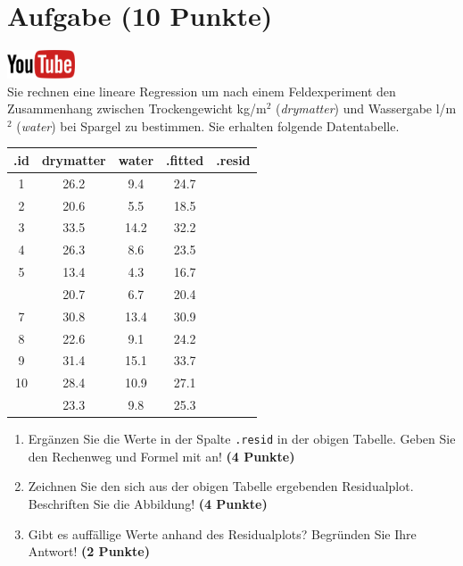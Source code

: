 \documentclass[a4paper, 9pt]{scrartcl}\usepackage[]{graphicx}\usepackage[]{xcolor}
\newenvironment{knitrout}{}{} %
\begin{document}
\section{Aufgabe \hfill (10 Punkte)}

\hfill\href{https://youtu.be/dyQlYV9nOqY}{\includegraphics[width =
  2cm]{img/youtube}}\\[1Ex]

Sie rechnen eine lineare Regression um nach einem Feldexperiment den
Zusammenhang zwischen Trockengewicht kg/m$^2$ (\textit{drymatter}) und
Wassergabe l/m$^2$ (\textit{water}) bei Spargel zu bestimmen. Sie erhalten
folgende Datentabelle.

\begin{knitrout}
\color{fgcolor}\begin{table}[!h]
\centering\begingroup\fontsize{12}{14}\selectfont

\begin{tabular}{ccccc}
\toprule
.id & drymatter & water & .fitted & .resid\\
\midrule
1 & 26.2 & 9.4 & 24.7 & \\
2 & 20.6 & 5.5 & 18.5 & \\
3 & 33.5 & 14.2 & 32.2 & \\
4 & 26.3 & 8.6 & 23.5 & \\
5 & 13.4 & 4.3 & 16.7 & \\
\addlinespace
6 & 20.7 & 6.7 & 20.4 & \\
7 & 30.8 & 13.4 & 30.9 & \\
8 & 22.6 & 9.1 & 24.2 & \\
9 & 31.4 & 15.1 & 33.7 & \\
10 & 28.4 & 10.9 & 27.1 & \\
\addlinespace
11 & 23.3 & 9.8 & 25.3 & \\
\bottomrule
\end{tabular}
\endgroup{}
\end{table}

\end{knitrout}

\begin{enumerate}
\item Erg{\"a}nzen Sie die Werte in der Spalte \texttt{.resid} in der obigen
  Tabelle. Geben Sie den Rechenweg und Formel mit an! \textbf{(4 Punkte)}
\item Zeichnen Sie den sich aus der obigen Tabelle ergebenden
  Residualplot. Beschriften Sie die Abbildung! \textbf{(4 Punkte)}
\item Gibt es auff{\"a}llige Werte anhand des Residualplots? Begr{\"u}nden Sie Ihre
  Antwort! \textbf{(2 Punkte)}
\end{enumerate}
 
\end{document}
